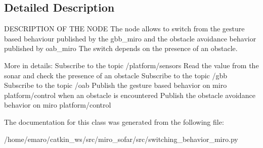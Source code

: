 \subsection{Detailed Description}
D\+E\+S\+C\+R\+I\+P\+T\+I\+ON OF T\+HE N\+O\+DE The node allows to switch from the gesture based behaviour published by the gbb\+\_\+miro and the obstacle avoidance behavior published by oab\+\_\+miro The switch depends on the presence of an obstacle. 

More in details\+: Subscribe to the topic /platform/sensors Read the value from the sonar and check the presence of an obstacle Subscribe to the topic /gbb Subscribe to the topic /oab Publish the gesture based behavior on miro platform/control when an obstacle is encountered Publish the obstacle avoidance behavior on miro platform/control 

The documentation for this class was generated from the following file\+:\begin{DoxyCompactItemize}
\item 
/home/emaro/catkin\+\_\+ws/src/miro\+\_\+sofar/src/switching\+\_\+behavior\+\_\+miro.\+py\end{DoxyCompactItemize}
